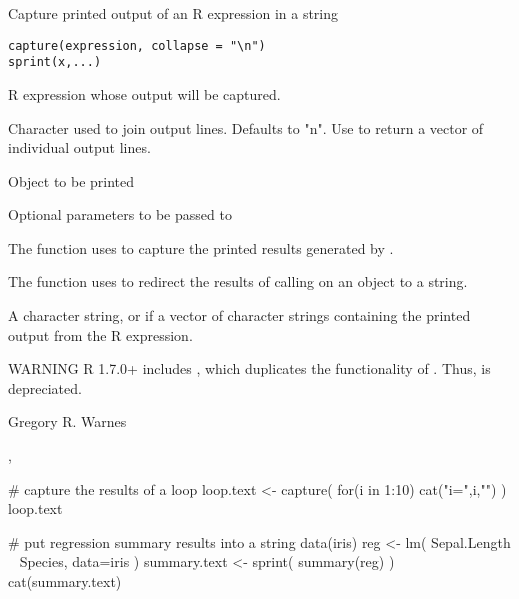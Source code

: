 \begin{Description}\relax
Capture printed output of an R expression in a string
\end{Description}
\begin{Usage}
\begin{verbatim}
capture(expression, collapse = "\n")
sprint(x,...)
\end{verbatim}
\end{Usage}
\begin{Arguments}
\begin{ldescription}
\item[\code{expression}] R expression whose output will be captured.
\item[\code{collapse}] Character used to join output lines.  Defaults to
"\bsl{}n".  Use  to return a vector of individual output lines.
\item[\code{x}] Object to be printed
\item[\code{...}] Optional parameters to be passed to  
\end{ldescription}
\end{Arguments}
\begin{Details}\relax
The  function uses  to capture the
printed results generated by . 

The function  uses  to redirect the
results of calling  on an object to a string.
\end{Details}
\begin{Value}
A character string, or if  a vector of character
strings containing the printed output from the R expression.
\end{Value}
\begin{Section}{WARNING}
R 1.7.0+ includes , which
duplicates the functionality of .  Thus, 
is depreciated.
\end{Section}
\begin{Author}\relax
Gregory R. Warnes 
\end{Author}
\begin{SeeAlso}\relax
{}, 
\end{SeeAlso}
\begin{Examples}
\begin{ExampleCode}

# capture the results of a loop
loop.text <- capture( for(i in 1:10) cat("i=",i,"\n") )
loop.text

# put regression summary results into a string
data(iris)
reg <- lm( Sepal.Length ~ Species, data=iris )
summary.text <- sprint( summary(reg) )
cat(summary.text)
\end{ExampleCode}
\end{Examples}


